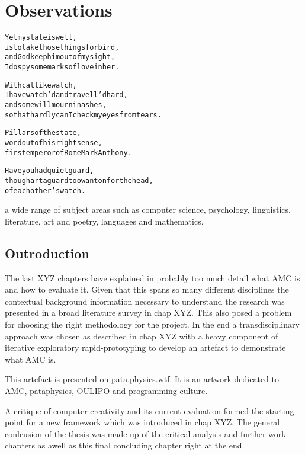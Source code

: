 
\chapter{Observations}
\label{ch:observations}

\startcontents[chapters]

\vfill

\begin{alltt}\sffamily
Yet my state is well,
is to take those things for bird,
and God keep him out of my sight,
I do spy some marks of love in her.

With catlike watch,
I have watch'd and travell'd hard,
and some will mourn in ashes,
so that hardly can I check my eyes from tears.

Pillars of the state,
word out of his right sense,
first emperor of Rome Mark Anthony.

Have you had quiet guard,
though art a guard too wanton for the head,
of each other's watch.
\end{alltt}

\newpage
\minicontents
\spirals


a wide range of subject areas such as computer science, psychology, linguistics, literature, art and poetry, languages and mathematics.


\section{Outroduction}

The last XYZ chapters have explained in probably too much detail what \ac{AMC} is and how to evaluate it. Given that this spans so many different disciplines the contextual background information necessary to understand the research was presented in a broad literature survey in chap XYZ. This also posed a problem for choosing the right methodology for the project. In the end a transdisciplinary approach was chosen as described in chap XYZ with a heavy component of iterative exploratory rapid-prototyping to develop an artefact to demonstrate what \ac{AMC} is. 

This artefact is presented on \url{pata.physics.wtf}. It is an artwork dedicated to \ac{AMC}, pataphysics, \ac{OULIPO} and programming culture.

A critique of computer creativity and its current evaluation formed the starting point for a new framework which was introduced in chap XYZ. The general conlcusion of the thesis was made up of the critical analysis and further work chapters as awell as this final concluding chapter right at the end.

